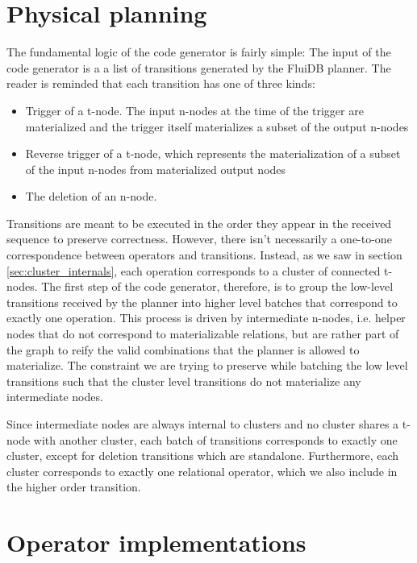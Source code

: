 \section{Physical planning}

The fundamental logic of the code generator is fairly simple: The
input of the code generator is a a list of transitions generated by
the FluiDB planner. The reader is reminded that each transition has
one of three kinds:

\begin{itemize}
\item Trigger of a t-node. The input n-nodes at the time of the trigger
are materialized and the trigger itself materializes a subset of the
output n-nodes
\item Reverse trigger of a t-node, which represents the
materialization of a subset of the input n-nodes from materialized
output nodes
\item The deletion of an n-node.
\end{itemize}

Transitions are meant to be executed in the order they appear in the
received sequence to preserve correctness. However, there isn't necessarily a
one-to-one correspondence between operators and transitions. Instead,
as we saw in section \ref{sec:cluster_internals}, each operation
corresponds to a cluster of connected t-nodes. The first step of the
code generator, therefore, is to group the low-level transitions
received by the planner into higher level batches that correspond to
exactly one operation. This process is driven by intermediate n-nodes,
i.e. helper nodes that do not correspond to materializable relations,
but are rather part of the graph to reify the valid combinations that
the planner is allowed to materialize. The constraint we are trying to
preserve while batching the low level transitions such that the
cluster level transitions do not materialize any intermediate nodes.

Since intermediate nodes are always internal to clusters and no
cluster shares a t-node with another cluster, each batch of
transitions corresponds to exactly one cluster, except for deletion
transitions which are standalone. Furthermore, each cluster
corresponds to exactly one relational operator, which we also include
in the higher order transition.

\section{Operator implementations}

